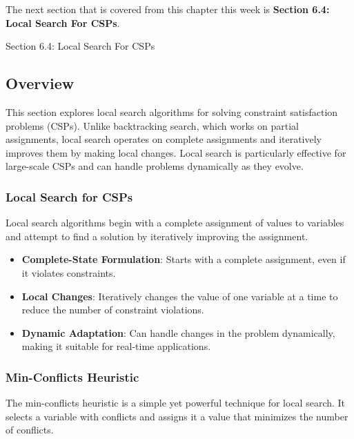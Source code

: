 The next section that is covered from this chapter this week is \textbf{Section 6.4: Local Search For CSPs}.

\begin{notes}{Section 6.4: Local Search For CSPs}
    \subsection*{Overview}

    This section explores local search algorithms for solving constraint satisfaction problems (CSPs). Unlike backtracking search, which works on partial assignments, local search operates on complete 
    assignments and iteratively improves them by making local changes. Local search is particularly effective for large-scale CSPs and can handle problems dynamically as they evolve.
    
    \subsubsection*{Local Search for CSPs}
    
    Local search algorithms begin with a complete assignment of values to variables and attempt to find a solution by iteratively improving the assignment.
    
    \begin{highlight}
    
        \begin{itemize}
            \item \textbf{Complete-State Formulation}: Starts with a complete assignment, even if it violates constraints.
            \item \textbf{Local Changes}: Iteratively changes the value of one variable at a time to reduce the number of constraint violations.
            \item \textbf{Dynamic Adaptation}: Can handle changes in the problem dynamically, making it suitable for real-time applications.
        \end{itemize}
    
    \end{highlight}
    
    \subsubsection*{Min-Conflicts Heuristic}
    
    The min-conflicts heuristic is a simple yet powerful technique for local search. It selects a variable with conflicts and assigns it a value that minimizes the number of conflicts.
    

\end{notes}
